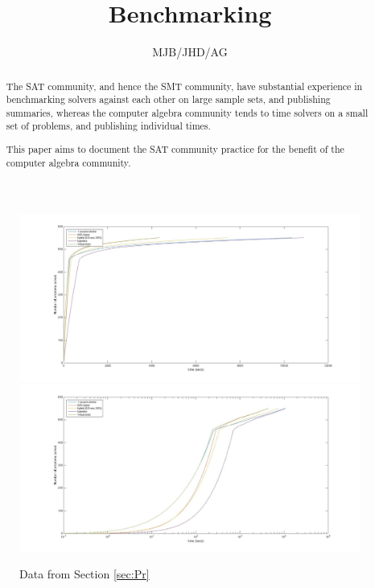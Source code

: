 \documentclass{article}
\begin{document}
\title{Benchmarking}
\author{MJB/JHD/AG}
\maketitle
\begin{abstract}\noindent
The SAT community, and hence the SMT community, have substantial experience in benchmarking solvers against each other on large sample sets, and publishing summaries, whereas the computer algebra community tends to time solvers on a small set of problems, and publishing individual times.
\par
This paper aims to document the SAT community practice for the benefit of the computer algebra community.
\end{abstract}

\begin{figure}[h]
\caption{Data from Section \ref{sec:Pr}\label{Fig:S2}}
\includegraphics[scale=0.25]{Fig2a.jpg}
\includegraphics[scale=0.25]{Fig2b.jpg}
\end{figure}
\end{document}
